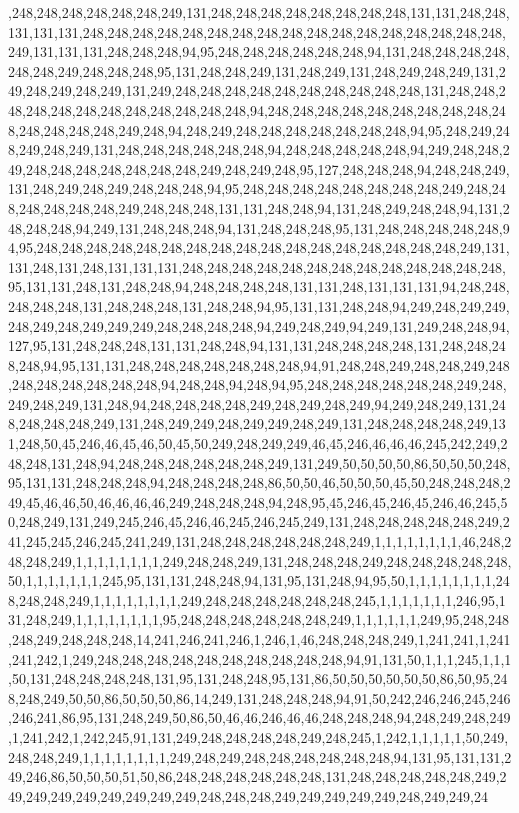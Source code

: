 ,248,248,248,248,248,248,249,131,248,248,248,248,248,248,248,248,131,131,248,248,131,131,131,248,248,248,248,248,248,248,248,248,248,248,248,248,248,248,248,248,249,131,131,131,248,248,248,94,95,248,248,248,248,248,248,94,131,248,248,248,248,248,248,249,248,248,248,95,131,248,248,249,131,248,249,131,248,249,248,249,131,249,248,249,248,249,131,249,248,248,248,248,248,248,248,248,248,248,131,248,248,248,248,248,248,248,248,248,248,248,248,94,248,248,248,248,248,248,248,248,248,248,248,248,248,248,249,248,94,248,249,248,248,248,248,248,248,248,94,95,248,249,248,249,248,249,131,248,248,248,248,248,248,94,248,248,248,248,248,94,249,248,248,249,248,248,248,248,248,248,248,249,248,249,248,95,127,248,248,248,94,248,248,249,131,248,249,248,249,248,248,248,94,95,248,248,248,248,248,248,248,248,249,248,248,248,248,248,248,249,248,248,248,131,131,248,248,94,131,248,249,248,248,94,131,248,248,248,94,249,131,248,248,248,94,131,248,248,248,95,131,248,248,248,248,248,94,95,248,248,248,248,248,248,248,248,248,248,248,248,248,248,248,248,248,249,131,131,248,131,248,131,131,131,248,248,248,248,248,248,248,248,248,248,248,248,248,95,131,131,248,131,248,248,94,248,248,248,248,131,131,248,131,131,131,94,248,248,248,248,248,131,248,248,248,131,248,248,94,95,131,131,248,248,94,249,248,249,249,248,249,248,249,249,249,248,248,248,248,94,249,248,249,94,249,131,249,248,248,94,127,95,131,248,248,248,131,131,248,248,94,131,131,248,248,248,248,131,248,248,248,248,94,95,131,131,248,248,248,248,248,248,248,94,91,248,248,249,248,248,249,248,248,248,248,248,248,248,94,248,248,94,248,94,95,248,248,248,248,248,248,249,248,249,248,249,131,248,94,248,248,248,248,249,248,249,248,249,94,249,248,249,131,248,248,248,248,249,131,248,249,249,248,249,249,248,249,131,248,248,248,248,249,131,248,50,45,246,46,45,46,50,45,50,249,248,249,249,46,45,246,46,46,46,245,242,249,248,248,131,248,94,248,248,248,248,248,248,249,131,249,50,50,50,50,86,50,50,50,248,95,131,131,248,248,248,94,248,248,248,248,86,50,50,46,50,50,50,45,50,248,248,248,249,45,46,46,50,46,46,46,46,249,248,248,248,94,248,95,45,246,45,246,45,246,46,245,50,248,249,131,249,245,246,45,246,46,245,246,245,249,131,248,248,248,248,248,249,241,245,245,246,245,241,249,131,248,248,248,248,248,248,249,1,1,1,1,1,1,1,1,46,248,248,248,249,1,1,1,1,1,1,1,1,249,248,248,249,131,248,248,248,249,248,248,248,248,248,50,1,1,1,1,1,1,1,245,95,131,131,248,248,94,131,95,131,248,94,95,50,1,1,1,1,1,1,1,1,248,248,248,249,1,1,1,1,1,1,1,1,249,248,248,248,248,248,248,245,1,1,1,1,1,1,1,246,95,131,248,249,1,1,1,1,1,1,1,1,95,248,248,248,248,248,248,249,1,1,1,1,1,1,249,95,248,248,248,249,248,248,248,14,241,246,241,246,1,246,1,46,248,248,248,249,1,241,241,1,241,241,242,1,249,248,248,248,248,248,248,248,248,248,248,94,91,131,50,1,1,1,245,1,1,1,50,131,248,248,248,248,131,95,131,248,248,95,131,86,50,50,50,50,50,50,86,50,95,248,248,249,50,50,86,50,50,50,86,14,249,131,248,248,248,94,91,50,242,246,246,245,246,246,241,86,95,131,248,249,50,86,50,46,46,246,46,46,248,248,248,94,248,249,248,249,1,241,242,1,242,245,91,131,249,248,248,248,248,249,248,245,1,242,1,1,1,1,1,50,249,248,248,249,1,1,1,1,1,1,1,1,249,248,249,248,248,248,248,248,248,94,131,95,131,131,249,246,86,50,50,50,51,50,86,248,248,248,248,248,248,131,248,248,248,248,248,249,249,249,249,249,249,249,249,249,248,248,248,249,249,249,249,249,248,249,249,24